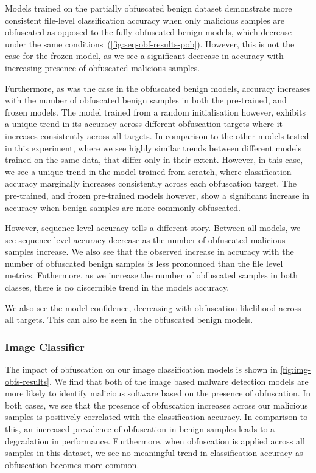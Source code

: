 \documentclass[conference,compsoc]{IEEEtran}
\begin{document}
Models trained on the partially obfuscated benign dataset demonstrate more consistent file-level classification accuracy when only malicious samples are obfuscated as opposed to the fully obfuscated benign models, which decrease under the same conditions~(\ref{fig:seq-obf-results-pob}). However, this is not the case for the frozen model, as we see a significant decrease in accuracy with increasing presence of obfuscated malicious samples. 

Furthermore, as was the case in the obfuscated benign models, accuracy increases with the number of obfuscated benign samples in both the pre-trained, and frozen models. The model trained from a random initialisation however, exhibits a unique trend in its accuracy across different obfuscation targets where it increases consistently across all targets. In comparison to the other models tested in this experiment, where we see highly similar trends between different models trained on the same data, that differ only in their extent. However, in this case, we see a unique trend in the model trained from scratch, where classification accuracy marginally increases consistently across each obfuscation target. The pre-trained, and frozen pre-trained models however, show a significant increase in accuracy when benign samples are more commonly obfuscated.

However, sequence level accuracy tells a different story. Between all models, we see sequence level accuracy decrease as the number of obfuscated malicious samples increase. We also see that the observed increase in accuracy with the number of obfuscated benign samples is less pronounced than the file level metrics. Futhermore, as we increase the number of obfuscated samples in both classes, there is no discernible trend in the models accuracy. 

We also see the model confidence, decreasing with obfuscation likelihood across all targets. This can also be seen in the obfuscated benign models. 

\subsubsection{Image Classifier}

The impact of obfuscation on our image classification models is shown in \ref{fig:img-obfs-results}. We find that both of the image based malware detection models are more likely to identify malicious software based on the presence of obfuscation. In both cases, we see that the presence of obfuscation increases across our malicious samples is positively correlated with the classification accuracy. In comparison to this, an increased prevalence of obfuscation in benign samples leads to a degradation in performance. Furthermore, when obfuscation is applied across all samples in this dataset, we see no meaningful trend in classification accuracy as obfuscation becomes more common. 
\end{document}
